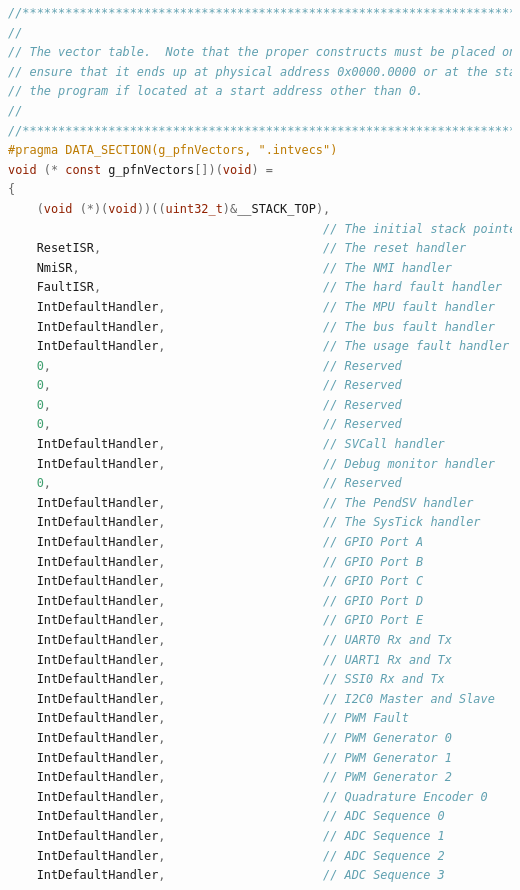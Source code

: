 \documentclass{article}
\begin{document}
\begin{lstlisting}[language=c, caption={startup$\textunderscore$ccs.c}, captionpos=b]
//*****************************************************************************
//
// The vector table.  Note that the proper constructs must be placed on this to
// ensure that it ends up at physical address 0x0000.0000 or at the start of
// the program if located at a start address other than 0.
//
//*****************************************************************************
#pragma DATA_SECTION(g_pfnVectors, ".intvecs")
void (* const g_pfnVectors[])(void) =
{
    (void (*)(void))((uint32_t)&__STACK_TOP),
                                            // The initial stack pointer
    ResetISR,                               // The reset handler
    NmiSR,                                  // The NMI handler
    FaultISR,                               // The hard fault handler
    IntDefaultHandler,                      // The MPU fault handler
    IntDefaultHandler,                      // The bus fault handler
    IntDefaultHandler,                      // The usage fault handler
    0,                                      // Reserved
    0,                                      // Reserved
    0,                                      // Reserved
    0,                                      // Reserved
    IntDefaultHandler,                      // SVCall handler
    IntDefaultHandler,                      // Debug monitor handler
    0,                                      // Reserved
    IntDefaultHandler,                      // The PendSV handler
    IntDefaultHandler,                      // The SysTick handler
    IntDefaultHandler,                      // GPIO Port A
    IntDefaultHandler,                      // GPIO Port B
    IntDefaultHandler,                      // GPIO Port C
    IntDefaultHandler,                      // GPIO Port D
    IntDefaultHandler,                      // GPIO Port E
    IntDefaultHandler,                      // UART0 Rx and Tx
    IntDefaultHandler,                      // UART1 Rx and Tx
    IntDefaultHandler,                      // SSI0 Rx and Tx
    IntDefaultHandler,                      // I2C0 Master and Slave
    IntDefaultHandler,                      // PWM Fault
    IntDefaultHandler,                      // PWM Generator 0
    IntDefaultHandler,                      // PWM Generator 1
    IntDefaultHandler,                      // PWM Generator 2
    IntDefaultHandler,                      // Quadrature Encoder 0
    IntDefaultHandler,                      // ADC Sequence 0
    IntDefaultHandler,                      // ADC Sequence 1
    IntDefaultHandler,                      // ADC Sequence 2
    IntDefaultHandler,                      // ADC Sequence 3

\end{lstlisting}
\end{document}
